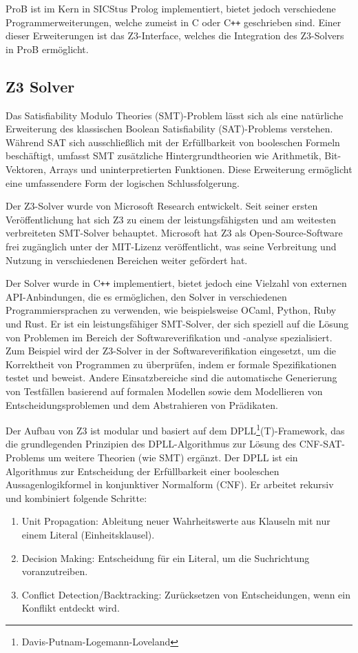 ProB ist im Kern in SICStus Prolog \cite{carlsson1988sicstus} implementiert, bietet jedoch verschiedene Programmerweiterungen, welche zumeist in C oder C\texttt{++} geschrieben sind.
Einer dieser Erweiterungen ist das Z3-Interface, welches die Integration des Z3-Solvers in ProB ermöglicht.

\subsection{Z3 Solver}

Das Satisfiability Modulo Theories (SMT)-Problem lässt sich als eine natürliche Erweiterung des klassischen Boolean Satisfiability (SAT)-Problems verstehen.
Während SAT sich ausschließlich mit der Erfüllbarkeit von booleschen Formeln beschäftigt,
umfasst SMT zusätzliche Hintergrundtheorien wie Arithmetik, Bit-Vektoren, Arrays und uninterpretierten Funktionen.
Diese Erweiterung ermöglicht eine umfassendere Form der logischen Schlussfolgerung.

Der Z3-Solver \cite{10.1007/978-3-540-78800-3_24} wurde von Microsoft Research entwickelt.
Seit seiner ersten Veröffentlichung hat sich Z3 zu einem der leistungsfähigsten und am weitesten verbreiteten SMT-Solver behauptet.
Microsoft hat Z3 als Open-Source-Software frei zugänglich unter der MIT-Lizenz veröffentlicht,
was seine Verbreitung und Nutzung in verschiedenen Bereichen weiter gefördert hat.

Der Solver wurde in C\texttt{++} implementiert, bietet jedoch eine Vielzahl von externen API-Anbindungen, die es ermöglichen, den Solver in verschiedenen Programmiersprachen zu verwenden,
wie beispielsweise OCaml, Python, Ruby und Rust.
Er ist ein leistungsfähiger SMT-Solver, der sich speziell auf die Lösung von Problemen im Bereich der Softwareverifikation und -analyse spezialisiert.
Zum Beispiel wird der Z3-Solver in der Softwareverifikation eingesetzt, um die Korrektheit von Programmen zu überprüfen, indem er formale Spezifikationen testet und beweist.
Andere Einsatzbereiche sind die automatische Generierung von Testfällen basierend auf formalen Modellen sowie dem Modellieren von Entscheidungsproblemen und dem Abstrahieren von Prädikaten.

Der Aufbau von Z3 ist modular und basiert auf dem DPLL\footnote{Davis-Putnam-Logemann-Loveland}(T)-Framework,
das die grundlegenden Prinzipien des DPLL-Algorithmus zur Lösung des CNF-SAT-Problems um weitere Theorien (wie SMT) ergänzt.
Der DPLL ist ein Algorithmus zur Entscheidung der Erfüllbarkeit einer booleschen Aussagenlogikformel in konjunktiver Normalform (CNF).
Er arbeitet rekursiv und kombiniert folgende Schritte:
\begin{enumerate}
    \item Unit Propagation: Ableitung neuer Wahrheitswerte aus Klauseln mit nur einem Literal (Einheitsklausel).
    \item Decision Making: Entscheidung für ein Literal, um die Suchrichtung voranzutreiben.
    \item Conflict Detection/Backtracking: Zurücksetzen von Entscheidungen, wenn ein Konflikt entdeckt wird.
\end{enumerate}    

